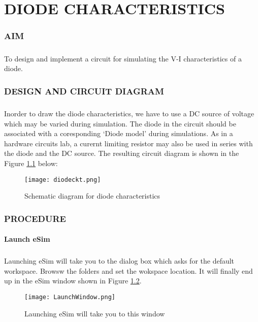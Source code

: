 \chapter{DIODE CHARACTERISTICS}

\subsection*{AIM}
\paragraph{}To design and implement a circuit for simulating the V-I characteristics of a diode.

\subsection*{DESIGN AND CIRCUIT DIAGRAM}
\paragraph{}

Inorder to draw the diode characteristics, we have to use a DC source of voltage which may be varied during simulation. The diode in the circuit should be associated with a coresponding `Diode model' during  simulations. As in a hardware circuits lab, a curernt limiting resistor may also be used in series with the diode and the DC source. The resulting circuit diagram is shown in the Figure \ref{diodeckt}  below:
\begin{figure}[h]
\centering
\texttt{[image: diodeckt.png]}
\caption{Schematic diagram for diode characteristics}
\label{diodeckt}
\end{figure}

\subsection*{PROCEDURE}

\subsubsection{Launch eSim}

\paragraph{}
 Launching eSim will take you to the dialog box which asks for the default workspace. Browsw the folders and set the wokspace location. It will finally end up in the eSim window shown in Figure \ref{LaunchWindow}.
\begin{figure}[h]
\centering
\texttt{[image: LaunchWindow.png]}
\caption{Launching eSim will take you to this window}
\label{LaunchWindow}
\end{figure}

